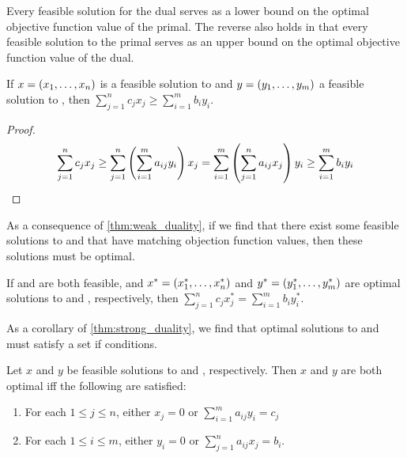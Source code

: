 Every feasible solution for the dual serves as a lower bound on the optimal objective function 
value of the primal. The reverse also holds in that every feasible solution to the primal 
serves as an upper bound on the optimal objective function value of the dual. 

\begin{theorem}
    If $x = \left( x_1, \ldots, x_n \right) $ is a feasible solution to \primal{} and $y = \left( y_1, \ldots, y_m \right) $ a feasible solution to \dual{}, 
    then $\sum_{j=1}^{n} c_j x_j \geq \sum_{i=1}^{m} b_i y_i$. 
    \label{thm:weak_duality}
\end{theorem}
\begin{proof}
    \begin{align*}
        \sum_{j=1}^{n} c_j x_j \geq \sum_{j=1}^{n} \left( \sum_{i=1}^{m} a_{ij} y_i \right) x_j
        =  \sum_{i=1}^{m} \left( \sum_{j=1}^{n} a_{ij} x_j \right) y_i 
        \geq \sum_{i=1}^{m} b_i y_i
    \end{align*}
\end{proof}

As a consequence of \cref{thm:weak_duality}, if we find that there exist some 
feasible solutions to \primal{} and \dual{} that have matching objection function values, 
then these solutions must be optimal. 

\begin{theorem}
    If \primal{} and \dual{} are both feasible, and $x^{\ast} = \left( x_1^{\ast}, \ldots, x_n^{\ast} \right)$
    and $y^{\ast} = \left( y_1^{\ast}, \ldots, y_m^{\ast} \right)$ are optimal solutions to \primal{} and \dual{}, respectively, 
    then $\sum_{j=1}^{n} c_j x_j^{\ast} = \sum_{i=1}^{m} b_i y_i^{\ast}$. 
    \label{thm:strong_duality}
\end{theorem}

As a corollary of \cref{thm:strong_duality}, we find that optimal solutions to \primal{} and \dual{}
must satisfy a set if conditions. 

\begin{corollary}
    Let $x$ and $y$ be feasible solutions to \primal{} and \dual{}, respectively. Then 
    $x$ and $y$ are both optimal iff the following are satisfied:
    \begin{enumerate}
        \item For each $1 \leq j \leq n$, either $x_j = 0$ or $\sum_{i=1}^{m} a_{ij}y_i = c_j$
        \item For each $1 \leq i \leq m$, either $y_i = 0$ or $\sum_{j=1}^{n} a_{ij} x_j = b_i$. 
    \end{enumerate}
    \label{cor:complementary_slack}
\end{corollary}

